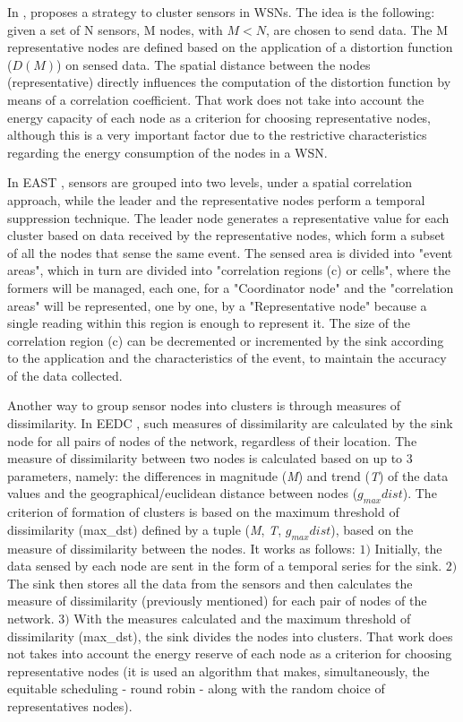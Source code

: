 \documentclass[conference]{IEEEtran}
\begin{document}
In \cite{Vuran2004}, proposes a strategy to cluster sensors in WSNs. The idea is
the following: given a set of N sensors, M nodes, with $M < N$, are chosen to
send data. The M representative nodes are defined based on the application of a
distortion function ($D(M)$) on sensed data.
The spatial distance between the nodes (representative) directly influences the
computation of the distortion function by means of a correlation coefficient.
That work does not take into account the energy capacity of each node as a
criterion for choosing representative nodes, although this is a very important
factor due to the restrictive characteristics regarding the energy consumption
of the nodes in a WSN.

In EAST \cite{Villas2012}, sensors are grouped into two levels, under a spatial
correlation approach, while the leader and the representative nodes perform a
temporal suppression technique.
The leader node generates a representative value for each cluster based on data
received by the representative nodes, which form a subset of all the nodes that
sense the same event. The sensed area is divided into "event areas", which in
turn are divided into "correlation regions (c) or cells", where the formers will
be managed, each one, for a "Coordinator node" and the "correlation areas" will
be represented, one by one, by a "Representative node" because a single reading
within this region is enough to represent it.
The size of the correlation region (c) can be decremented or incremented by the
sink according to the application and the characteristics of the event, to
maintain the accuracy of the data collected.

Another way to group sensor nodes into clusters is through measures of
dissimilarity.
In EEDC \cite{Liu2007}, such measures of dissimilarity are calculated by the
sink node for all pairs of nodes of the network, regardless of their location.
The measure of dissimilarity between two nodes is calculated based on up to $3$
parameters, namely:
the differences in magnitude (\textit{M}) and trend (\textit{T}) of the data
values and the geographical/euclidean distance between nodes ($g_{max}dist$).
The criterion of formation of clusters is based on the maximum threshold of
dissimilarity (max\_dst) defined by a tuple (\textit{M}, \textit{T},
$g_{max}dist$), based on the measure of dissimilarity between the nodes. It
works as follows: $1)$ Initially, the data sensed by each node are sent in the
form of a temporal series for the sink. $2)$ The sink then stores all the data
from the sensors and then calculates the measure of dissimilarity (previously
mentioned) for each pair of nodes of the network. $3)$ With the measures
calculated and the maximum threshold of dissimilarity (max\_dst), the sink
divides the nodes into clusters. 
That work does not takes into account the energy reserve of each node as a
criterion for choosing representative nodes (it is used an algorithm that makes,
simultaneously, the equitable scheduling - round robin - along with the random
choice of representatives nodes).
\end{document}
